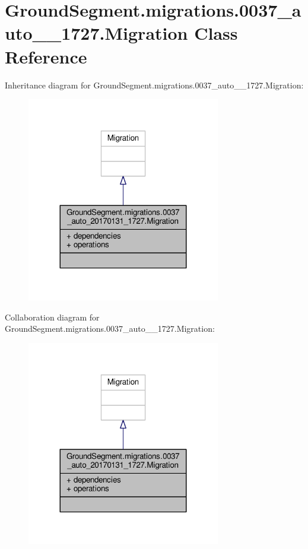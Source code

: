 \hypertarget{class_ground_segment_1_1migrations_1_10037__auto__20170131__1727_1_1_migration}{}\section{Ground\+Segment.\+migrations.0037\+\_\+auto\+\_\+\_\+1727.Migration Class Reference}
\label{class_ground_segment_1_1migrations_1_10037__auto__20170131__1727_1_1_migration}


Inheritance diagram for Ground\+Segment.\+migrations.0037\+\_\+auto\+\_\+\_\+1727.Migration\+:\nopagebreak
\begin{figure}[H]
\begin{center}
\leavevmode
\includegraphics[width=239pt]{class_ground_segment_1_1migrations_1_10037__auto__20170131__1727_1_1_migration__inherit__graph}
\end{center}
\end{figure}


Collaboration diagram for Ground\+Segment.\+migrations.0037\+\_\+auto\+\_\+\_\+1727.Migration\+:\nopagebreak
\begin{figure}[H]
\begin{center}
\leavevmode
\includegraphics[width=239pt]{class_ground_segment_1_1migrations_1_10037__auto__20170131__1727_1_1_migration__coll__graph}
\end{center}
\end{figure}
